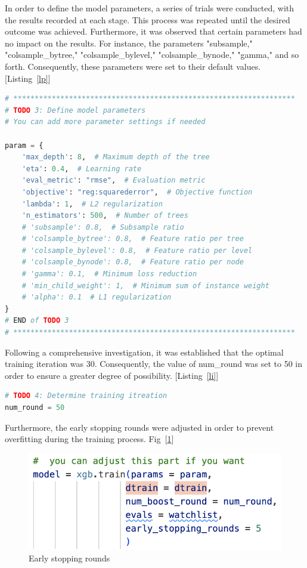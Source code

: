\documentclass{article}
\begin{document}
In order to define the model parameters, a series of trials were conducted, with the results recorded at each stage. This process was repeated until the desired outcome was achieved. Furthermore, it was observed that certain parameters had no impact on the results. For instance, the parameters "subsample," "colsample\_bytree," "colsample\_bylevel," "colsample\_bynode," "gamma," and so forth. Consequently, these parameters were set to their default values. [Listing~\ref{lp}]

\begin{lstlisting}[language={python}, caption={Define model parameters}, label={lp}]
# ******************************************************************
# TODO 3: Define model parameters
# You can add more parameter settings if needed

param = {
    'max_depth': 8,  # Maximum depth of the tree
    'eta': 0.4,  # Learning rate
    'eval_metric': "rmse",  # Evaluation metric
    'objective': "reg:squarederror",  # Objective function
    'lambda': 1,  # L2 regularization
    'n_estimators': 500,  # Number of trees
    # 'subsample': 0.8,  # Subsample ratio
    # 'colsample_bytree': 0.8,  # Feature ratio per tree
    # 'colsample_bylevel': 0.8,  # Feature ratio per level
    # 'colsample_bynode': 0.8,  # Feature ratio per node
    # 'gamma': 0.1,  # Minimum loss reduction
    # 'min_child_weight': 1,  # Minimum sum of instance weight
    # 'alpha': 0.1  # L1 regularization
}
# END of TODO 3
# ******************************************************************
\end{lstlisting}

Following a comprehensive investigation, it was established that the optimal training iteration was 30. Consequently, the value of num\_round was set to 50 in order to ensure a greater degree of possibility. [Listing~\ref{li}]

\begin{lstlisting}[language={python}, caption={Determine training itreation}, label={li}]
# TODO 4: Determine training itreation
num_round = 50
\end{lstlisting}

Furthermore, the early stopping rounds were adjusted in order to prevent overfitting during the training process. Fig~[\ref{stop}]

\begin{figure}[H]
    \centering
    \includegraphics[width=0.5\linewidth]{./img/2024-06-13-23-06-01.png
    }
    \caption{Early stopping rounds}
    \label{stop}
  \end{figure}
\end{document}
